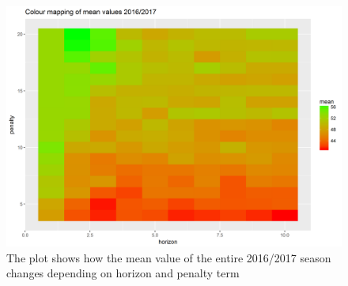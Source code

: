 \begin{figure}
\label{fig:pen_hor_scale}
    \centering
    \includegraphics[scale=0.50]{fig/chapter_5/pen_hor_scale.png}
    \caption{The plot shows how the mean value of the entire 2016/2017 season changes depending on horizon and penalty term}
\end{figure}











